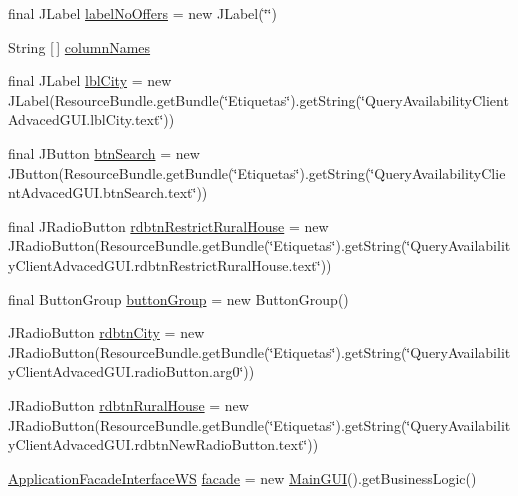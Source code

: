 \begin{DoxyCompactItemize}
\item 
final J\+Label \mbox{\hyperlink{classgui_1_1_query_availability_client_advaced_g_u_i_a4de669b611d113ec3d2566c7f52a34ca}{label\+No\+Offers}} = new J\+Label(\char`\"{}\char`\"{})
\item 
String \mbox{[}$\,$\mbox{]} \mbox{\hyperlink{classgui_1_1_query_availability_client_advaced_g_u_i_acb5af5a81afce89dce5df2d28c17f18c}{column\+Names}}
\item 
final J\+Label \mbox{\hyperlink{classgui_1_1_query_availability_client_advaced_g_u_i_acd2c162465aa814c6fad17b36d0e3d47}{lbl\+City}} = new J\+Label(Resource\+Bundle.\+get\+Bundle(\char`\"{}Etiquetas\char`\"{}).get\+String(\char`\"{}Query\+Availability\+Client\+Advaced\+G\+U\+I.\+lbl\+City.\+text\char`\"{}))
\item 
final J\+Button \mbox{\hyperlink{classgui_1_1_query_availability_client_advaced_g_u_i_ae3c0a2ae49819aef2cf667f448686f6f}{btn\+Search}} = new J\+Button(Resource\+Bundle.\+get\+Bundle(\char`\"{}Etiquetas\char`\"{}).get\+String(\char`\"{}Query\+Availability\+Client\+Advaced\+G\+U\+I.\+btn\+Search.\+text\char`\"{}))
\item 
final J\+Radio\+Button \mbox{\hyperlink{classgui_1_1_query_availability_client_advaced_g_u_i_a755a3dccd546ef1397ef0889652dd76a}{rdbtn\+Restrict\+Rural\+House}} = new J\+Radio\+Button(Resource\+Bundle.\+get\+Bundle(\char`\"{}Etiquetas\char`\"{}).get\+String(\char`\"{}Query\+Availability\+Client\+Advaced\+G\+U\+I.\+rdbtn\+Restrict\+Rural\+House.\+text\char`\"{}))
\item 
final Button\+Group \mbox{\hyperlink{classgui_1_1_query_availability_client_advaced_g_u_i_ae4d5a42f1a3c5b1f36444e1903f213f9}{button\+Group}} = new Button\+Group()
\item 
J\+Radio\+Button \mbox{\hyperlink{classgui_1_1_query_availability_client_advaced_g_u_i_a5a0c4df2fff9b4342f7036d740f4a6f6}{rdbtn\+City}} = new J\+Radio\+Button(Resource\+Bundle.\+get\+Bundle(\char`\"{}Etiquetas\char`\"{}).get\+String(\char`\"{}Query\+Availability\+Client\+Advaced\+G\+U\+I.\+radio\+Button.\+arg0\char`\"{}))
\item 
J\+Radio\+Button \mbox{\hyperlink{classgui_1_1_query_availability_client_advaced_g_u_i_a1e9d6054bfe1c1b27a5a8f7fc6adcd81}{rdbtn\+Rural\+House}} = new J\+Radio\+Button(Resource\+Bundle.\+get\+Bundle(\char`\"{}Etiquetas\char`\"{}).get\+String(\char`\"{}Query\+Availability\+Client\+Advaced\+G\+U\+I.\+rdbtn\+New\+Radio\+Button.\+text\char`\"{}))
\item 
\mbox{\hyperlink{interfacebusiness_logic_1_1_application_facade_interface_w_s}{Application\+Facade\+Interface\+WS}} \mbox{\hyperlink{classgui_1_1_query_availability_client_advaced_g_u_i_ae8664f7594365748b41e753bed1d338d}{facade}} = new \mbox{\hyperlink{classgui_1_1_main_g_u_i}{Main\+G\+UI}}().get\+Business\+Logic()

\end{DoxyCompactItemize}
